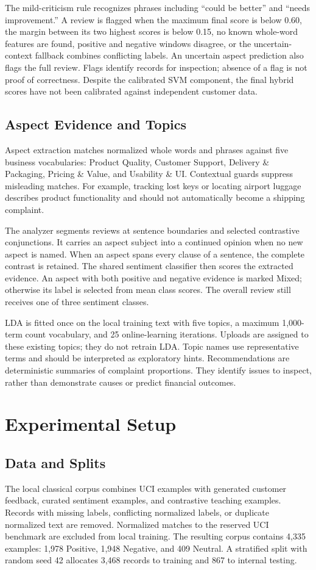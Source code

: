 \documentclass[conference,a4paper]{IEEEtran}
\begin{document}
The mild-criticism rule recognizes phrases including ``could be better'' and ``needs improvement.'' A review is flagged when the maximum final score is below 0.60, the margin between its two highest scores is below 0.15, no known whole-word features are found, positive and negative windows disagree, or the uncertain-context fallback combines conflicting labels. An uncertain aspect prediction also flags the full review. Flags identify records for inspection; absence of a flag is not proof of correctness. Despite the calibrated SVM component, the final hybrid scores have not been calibrated against independent customer data.

\subsection{Aspect Evidence and Topics}
Aspect extraction matches normalized whole words and phrases against five business vocabularies: Product Quality, Customer Support, Delivery \& Packaging, Pricing \& Value, and Usability \& UI. Contextual guards suppress misleading matches. For example, tracking lost keys or locating airport luggage describes product functionality and should not automatically become a shipping complaint.

The analyzer segments reviews at sentence boundaries and selected contrastive conjunctions. It carries an aspect subject into a continued opinion when no new aspect is named. When an aspect spans every clause of a sentence, the complete contrast is retained. The shared sentiment classifier then scores the extracted evidence. An aspect with both positive and negative evidence is marked Mixed; otherwise its label is selected from mean class scores. The overall review still receives one of three sentiment classes.

LDA is fitted once on the local training text with five topics, a maximum 1,000-term count vocabulary, and 25 online-learning iterations. Uploads are assigned to these existing topics; they do not retrain LDA. Topic names use representative terms and should be interpreted as exploratory hints. Recommendations are deterministic summaries of complaint proportions. They identify issues to inspect, rather than demonstrate causes or predict financial outcomes.

\section{Experimental Setup}
\subsection{Data and Splits}
The local classical corpus combines UCI examples with generated customer feedback, curated sentiment examples, and contrastive teaching examples. Records with missing labels, conflicting normalized labels, or duplicate normalized text are removed. Normalized matches to the reserved UCI benchmark are excluded from local training. The resulting corpus contains 4,335 examples: 1,978 Positive, 1,948 Negative, and 409 Neutral. A stratified split with random seed 42 allocates 3,468 records to training and 867 to internal testing.
\end{document}
